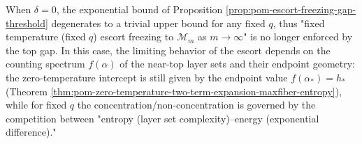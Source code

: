 \begin{remark}\label{rem:pom-top-gap-degenerate-flat-top}
When \(\delta=0\), the exponential bound of Proposition \ref{prop:pom-escort-freezing-gap-threshold} degenerates to a trivial upper bound for any fixed \(q\),
thus "fixed temperature (fixed \(q\)) escort freezing to \(\mathcal{M}_m\) as \(m\to\infty\)" is no longer enforced by the top gap.
In this case, the limiting behavior of the escort depends on the counting spectrum \(f(\alpha)\) of the near-top layer sets and their endpoint geometry:
the zero-temperature intercept is still given by the endpoint value \(f(\alpha_\ast)=h_\ast\) (Theorem \ref{thm:pom-zero-temperature-two-term-expansion-maxfiber-entropy}),
while for fixed \(q\) the concentration/non-concentration is governed by the competition between "entropy (layer set complexity)--energy (exponential difference)."
\end{remark}



